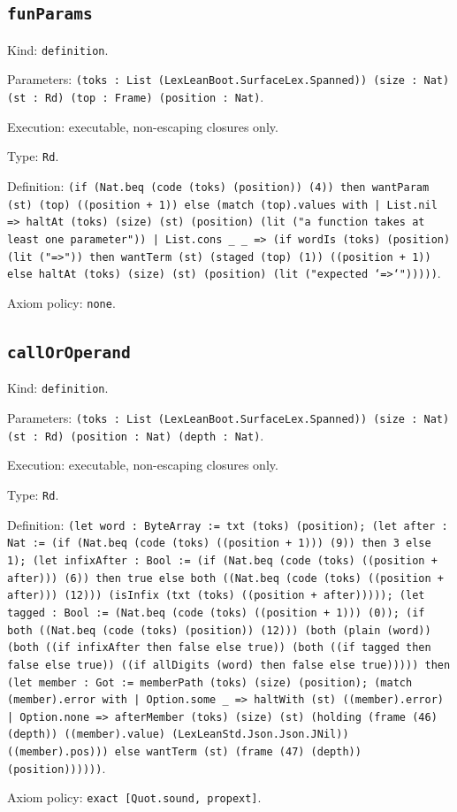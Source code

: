 \documentclass[11pt]{article}
\begin{document}
\subsection*{\texttt{funParams}}
\noindent Kind: \texttt{definition}.\par
\noindent Parameters: \texttt{(toks : List (LexLeanBoot.SurfaceLex.Spanned)) (size : Nat) (st : Rd) (top : Frame) (position : Nat)}.\par
\noindent Execution: executable, non-escaping closures only.\par
\noindent Type: \texttt{Rd}.\par
\noindent Definition: \texttt{(if (Nat.beq (code (toks) (position)) (4)) then wantParam (st) (top) ((position + 1)) else (match (top).values with | List.nil => haltAt (toks) (size) (st) (position) (lit ("a function takes at least one parameter")) | List.cons \_ \_ => (if wordIs (toks) (position) (lit ("=>")) then wantTerm (st) (staged (top) (1)) ((position + 1)) else haltAt (toks) (size) (st) (position) (lit ("expected `=>`")))))}.\par
\noindent Axiom policy: \texttt{none}.\par
\subsection*{\texttt{callOrOperand}}
\noindent Kind: \texttt{definition}.\par
\noindent Parameters: \texttt{(toks : List (LexLeanBoot.SurfaceLex.Spanned)) (size : Nat) (st : Rd) (position : Nat) (depth : Nat)}.\par
\noindent Execution: executable, non-escaping closures only.\par
\noindent Type: \texttt{Rd}.\par
\noindent Definition: \texttt{(let word : ByteArray := txt (toks) (position); (let after : Nat := (if (Nat.beq (code (toks) ((position + 1))) (9)) then 3 else 1); (let infixAfter : Bool := (if (Nat.beq (code (toks) ((position + after))) (6)) then true else both ((Nat.beq (code (toks) ((position + after))) (12))) (isInfix (txt (toks) ((position + after))))); (let tagged : Bool := (Nat.beq (code (toks) ((position + 1))) (0)); (if both ((Nat.beq (code (toks) (position)) (12))) (both (plain (word)) (both ((if infixAfter then false else true)) (both ((if tagged then false else true)) ((if allDigits (word) then false else true))))) then (let member : Got := memberPath (toks) (size) (position); (match (member).error with | Option.some \_ => haltWith (st) ((member).error) | Option.none => afterMember (toks) (size) (st) (holding (frame (46) (depth)) ((member).value) (LexLeanStd.Json.Json.JNil)) ((member).pos))) else wantTerm (st) (frame (47) (depth)) (position))))))}.\par
\noindent Axiom policy: \texttt{exact [Quot.sound, propext]}.\par
\end{document}
